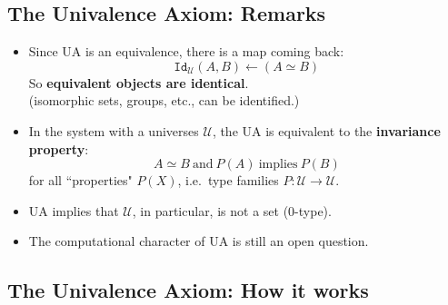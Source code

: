 \documentclass[11pt]{article}
\newcommand{\myemph}[1]{\textbf{#1}}    %
\newcommand{\U}{\mathcal{U}}
\newcommand{\id}[1]{\texttt{Id}_{#1}}
\begin{document}
\subsection*{The Univalence Axiom: Remarks}

\begin{itemize}
\item Since UA is an equivalence, there is a map coming back:
\begin{equation*}
 \id{\U}(A,B) \longleftarrow  (A\simeq B)
\end{equation*}
So \myemph{equivalent objects are identical}.\\
(isomorphic sets, groups, etc., can be identified.)

\item In the system with a universes $\U$, the UA is equivalent to the \myemph{invariance property}:
\[
A \simeq B\ \text{and}\ P(A)\ \text{implies}\ P(B)
\]
for all ``properties" $P(X)$, i.e.\ type families $P:\U \to \U$.

\item UA implies that $\U$, in particular, is not a set ($0$-type).

\item The computational character of UA is still an open question.


\end{itemize}


\subsection*{The Univalence Axiom: How it works}
%
\end{document}
